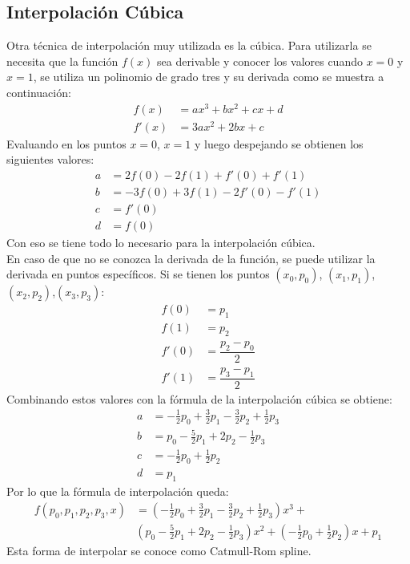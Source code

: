 \subsection{Interpolación Cúbica}
Otra técnica de interpolación muy utilizada es la cúbica. Para utilizarla se necesita que la función $f\left( x \right) $ sea derivable y conocer los valores cuando $x=0$ y $x=1$, se utiliza un polinomio de grado tres y su derivada como se muestra a continuación:
\begin{align}
f\left( x \right) &= ax^3 + bx^2 + cx + d\\
f\prime\left( x \right) &= 3ax^2 + 2bx + c
\end{align}
Evaluando en los puntos $x=0$, $x=1$ y luego despejando se obtienen los siguientes valores:
\begin{align}
a &= 2f(0) - 2f(1) + f\prime(0) + f\prime(1)\\
b &= -3f(0) + 3f(1) - 2f\prime(0) - f\prime(1)\\
c &= f\prime(0)\\
d &= f(0)
\end{align}
Con eso se tiene todo lo necesario para la interpolación cúbica.\\
En caso de que no se conozca la derivada de la función,  se puede utilizar la derivada en puntos específicos. Si se tienen los puntos $\left(x_{0} ,p_{0} \right)$, $\left(x_{1} ,p_{1} \right)$,$\left(x_{2} ,p_{2} \right)$,$\left(x_{3} ,p_{3} \right)$:
\begin{align}
f(0) &= p_1\\
f(1) &= p_2\\
f\prime(0) &= \dfrac{p_2 - p_0}{2}\\
f\prime(1) &= \dfrac{p_3 - p_1}{2}
\end{align}
Combinando estos valores con la fórmula de la interpolación cúbica se obtiene:
\begin{align}
a &= -\tfrac{1}{2}p_0 + \tfrac{3}{2}p_1 - \tfrac{3}{2}p_2 + \tfrac{1}{2}p_3\\
b &= p_0 - \tfrac{5}{2}p_1 + 2p_2 - \tfrac{1}{2}p_3\\
c &= -\tfrac{1}{2}p_0 + \tfrac{1}{2}p_2\\
d &= p_1
\end{align}
Por lo que la fórmula de interpolación queda:
\begin{equation}
\begin{split}
f(p_0,p_1,p_2,p_3,x) &= (-\tfrac{1}{2}p_0 + \tfrac{3}{2}p_1 - \tfrac{3}{2}p_2 + \tfrac{1}{2}p_3)x^3 + \\ 
& (p_0 - \tfrac{5}{2}p_1 + 2p_2 - \tfrac{1}{2}p_3)x^2 + (-\tfrac{1}{2}p_0 + \tfrac{1}{2}p_2)x + p_1
\end{split}
\end{equation}
Esta forma de interpolar se conoce como Catmull-Rom spline.

